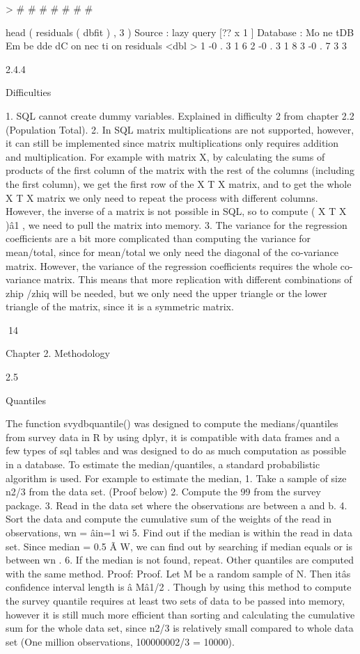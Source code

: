 >
#
#
#
#
#
#
#

head ( residuals ( dbfit ) , 3 )
Source :
lazy query [?? x 1 ]
Database : Mo ne tDB Em be dde dC on nec ti on
residuals
<dbl >
1
-0 . 3 1 6
2
-0 . 3 1 8
3
-0 . 7 3 3

2.4.4

Difficulties

1. SQL cannot create dummy variables. Explained in difficulty 2 from chapter 2.2
(Population Total).
2. In SQL matrix multiplications are not supported, however, it can still be implemented since matrix multiplications only requires addition and multiplication.
For example with matrix X, by calculating the sums of products of the first column of the matrix with the rest of the columns (including the first column), we
get the first row of the X T X matrix, and to get the whole X T X matrix we only
need to repeat the process with different columns. However, the inverse of
a matrix is not possible in SQL, so to compute ( X T X )â1 , we need to pull the
matrix into memory.
3. The variance for the regression coefficients are a bit more complicated than
computing the variance for mean/total, since for mean/total we only need the
diagonal of the co-variance matrix. However, the variance of the regression coefficients requires the whole co-variance matrix. This means that more replication with different combinations of zhip /zhiq will be needed, but we only need
the upper triangle or the lower triangle of the matrix, since it is a symmetric
matrix.

14

Chapter 2. Methodology

2.5

Quantiles

The function svydbquantile() was designed to compute the medians/quantiles
from survey data in R by using dplyr, it is compatible with data frames and a few
types of sql tables and was designed to do as much computation as possible in a
database.
To estimate the median/quantiles, a standard probabilistic algorithm is used. For
example to estimate the median,
1. Take a sample of size n2/3 from the data set. (Proof below)
2. Compute the 99%
from the survey package.
3. Read in the data set where the observations are between a and b.
4. Sort the data and compute the cumulative sum of the weights of the read in
observations, wn = âin=1 wi
5. Find out if the median is within the read in data set. Since median = 0.5 Ã W,
we can find out by searching if median equals or is between wn .
6. If the median is not found, repeat.
Other quantiles are computed with the same method.
Proof:
Proof. Let M be a random sample of N.
Then itâs confidence interval length is â Mâ1/2 .
Though by using this method to compute the survey quantile requires at least
two sets of data to be passed into memory, however it is still much more efficient
than sorting and calculating the cumulative sum for the whole data set, since n2/3 is
relatively small compared to whole data set (One million observations, 100000002/3 =
10000).

